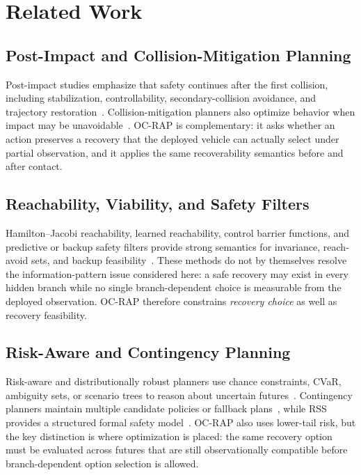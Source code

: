 \documentclass{article} %
\begin{document}
\section{Related Work}

\subsection{Post-Impact and Collision-Mitigation Planning}
Post-impact studies emphasize that safety continues after the first collision, including stabilization, controllability, secondary-collision avoidance, and trajectory restoration~\citep{koopman2024anatomy,wang2023integrated,parseh2023motion,wang2024post,yang2025post,ghosh2026post}. Collision-mitigation planners also optimize behavior when impact may be unavoidable~\citep{li2022vehicle,bosia2024real}. OC-RAP is complementary: it asks whether an action preserves a recovery that the deployed vehicle can actually select under partial observation, and it applies the same recoverability semantics before and after contact.

\subsection{Reachability, Viability, and Safety Filters}
Hamilton--Jacobi reachability, learned reachability, control barrier functions, and predictive or backup safety filters provide strong semantics for invariance, reach-avoid sets, and backup feasibility~\citep{bansal2017hamilton,bansal2021deepreach,lin2023generating,borquez2022parameter,ames2019control,koller2018learning,wabersich2021predictive,tearle2021predictive,kim2026backup,so2023solving}. These methods do not by themselves resolve the information-pattern issue considered here: a safe recovery may exist in every hidden branch while no single branch-dependent choice is measurable from the deployed observation. OC-RAP therefore constrains \emph{recovery choice} as well as recovery feasibility.

\subsection{Risk-Aware and Contingency Planning}
Risk-aware and distributionally robust planners use chance constraints, CVaR, ambiguity sets, or scenario trees to reason about uncertain futures~\citep{uryasev2000conditional,hakobyan2021wasserstein,safaoui2024distributionally,batkovic2020robust,nair2024predictive}. Contingency planners maintain multiple candidate policies or fallback plans~\citep{li2023marc,mustafa2024racp}, while RSS provides a structured formal safety model~\citep{shalev2017formal}. OC-RAP also uses lower-tail risk, but the key distinction is where optimization is placed: the same recovery option must be evaluated across futures that are still observationally compatible before branch-dependent option selection is allowed.
\end{document}
